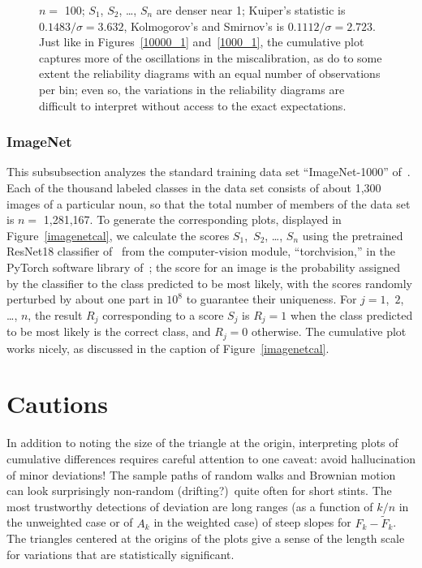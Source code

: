 \documentclass{article}
\begin{document}
\begin{figure}
\begin{centering}
\end{centering}
\caption{$n =$ 100; $S_1$, $S_2$, \dots, $S_n$ are denser near 1;
         Kuiper's statistic is $0.1483 / \sigma = 3.632$,
         Kolmogorov's and Smirnov's is $0.1112 / \sigma = 2.723$.
Just like in Figures~\ref{10000_1} and~\ref{1000_1},
the cumulative plot captures more of the oscillations in the miscalibration,
as do to some extent the reliability diagrams with an equal number
of observations per bin; even so, the variations in the reliability diagrams
are difficult to interpret without access to the exact expectations.
}
\label{100_1}
\end{figure}



\subsubsection{ImageNet}
\label{aimagenetex}

This subsubsection analyzes the standard training data set ``ImageNet-1000''
of~\cite{imagenet}. Each of the thousand labeled classes in the data set
consists of about 1,300 images of a particular noun,
so that the total number of members of the data set is $n =$ 1,281,167.
To generate the corresponding plots, displayed in Figure~\ref{imagenetcal},
we calculate the scores $S_1$,~$S_2$, \dots, $S_n$
using the pretrained ResNet18 classifier of~\cite{he-zhang-ren-sun}
from the computer-vision module, ``torchvision,''
in the PyTorch software library of~\cite{pytorch};
the score for an image is the probability assigned by the classifier
to the class predicted to be most likely,
with the scores randomly perturbed by about one part in $10^8$ to guarantee
their uniqueness.
For $j = 1$,~$2$, \dots, $n$, the result $R_j$ corresponding to a score $S_j$
is $R_j = 1$ when the class predicted to be most likely is the correct class,
and $R_j = 0$ otherwise. The cumulative plot works nicely,
as discussed in the caption of Figure~\ref{imagenetcal}.



\newpage



\section{Cautions}
\label{caution}

In addition to noting the size of the triangle at the origin,
interpreting plots of cumulative differences
requires careful attention to one caveat:
avoid hallucination of minor deviations!
The sample paths of random walks and Brownian motion can look surprisingly
non-random (drifting?)\ quite often for short stints.
The most trustworthy detections of deviation are long ranges
(as a function of $k/n$ in the unweighted case
or of $A_k$ in the weighted case) of steep slopes for $F_k-\tilde{F}_k$.
The triangles centered at the origins of the plots give a sense
of the length scale for variations that are statistically significant.
\end{document}
